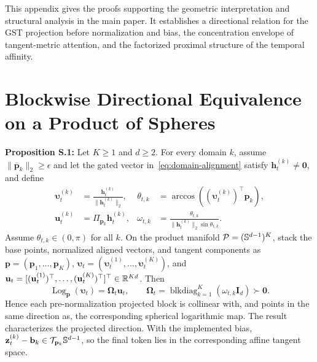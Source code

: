 This appendix gives the proofs supporting the geometric interpretation and structural analysis in the main paper. It establishes a directional relation for the GST projection before normalization and bias, the concentration envelope of tangent-metric attention, and the factorized proximal structure of the temporal affinity.
\section{Blockwise Directional Equivalence on a Product of Spheres}
\label{app:blockwise}
\textbf{Proposition S.1:} Let \(K\geq1\) and \(d\geq2\). For every domain \(k\), assume \(\|\overline{\mathbf p}_k\|_2\geq\epsilon\) and let the gated vector in~\eqref{eq:domain-alignment} satisfy \(\mathbf h_t^{(k)}\neq\mathbf0\), and define
\label{prop:block-direction}
\begin{align}
\boldsymbol{\upsilon}_t^{(k)}
&=\frac{\mathbf h_t^{(k)}}{\|\mathbf h_t^{(k)}\|_2},
&\theta_{t,k}
&=\arccos\!\left((\boldsymbol{\upsilon}_t^{(k)})^\top\mathbf p_k\right),\nonumber\\
\mathbf u_t^{(k)}
&=\Pi_{\mathbf p_k}\mathbf h_t^{(k)},
&\omega_{t,k}
&=\frac{\theta_{t,k}}
{\|\mathbf h_t^{(k)}\|_2\sin\theta_{t,k}}.
\label{eq:app-block-definitions}
\end{align}
Assume \(\theta_{t,k}\in(0,\pi)\) for all \(k\). On the product manifold
\(\mathcal P=(\mathbb{S}^{d-1})^K\), stack the base points, normalized aligned vectors, and tangent components as \(\mathbf p=(\mathbf p_1,\ldots,\mathbf p_K)\), \(\boldsymbol{\upsilon}_t=(\boldsymbol{\upsilon}_t^{(1)},\ldots,\boldsymbol{\upsilon}_t^{(K)})\), and \(\mathbf u_t=[(\mathbf u_t^{(1)})^\top,\ldots,(\mathbf u_t^{(K)})^\top]^\top\in\mathbb{R}^{Kd}\). Then
\begin{equation}
\operatorname{Log}_{\mathbf p}(\boldsymbol{\upsilon}_t)
=\boldsymbol{\Omega}_t\mathbf u_t,
\qquad
\boldsymbol{\Omega}_t
=\operatorname{blkdiag}_{k=1}^{K}(\omega_{t,k}\mathbf I_d)\succ\mathbf0.
\label{eq:app-log}
\end{equation}
Hence each pre-normalization projected block is collinear with, and points in the same direction as, the corresponding spherical logarithmic map. The result characterizes the projected direction. With the implemented bias, \(\mathbf z_t^{(k)}-\mathbf b_k\in\mathcal{T}_{\mathbf p_k}\mathbb{S}^{d-1}\), so the final token lies in the corresponding affine tangent space.

